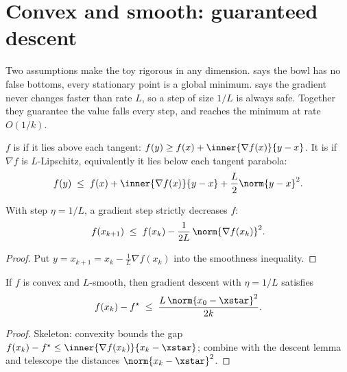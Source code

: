 \section{Convex and smooth: guaranteed descent}\label{sec:smooth}
\quad{}

\begin{strand}
Two assumptions make the toy rigorous in any dimension.  says the bowl has no
false bottoms, every stationary point is a global minimum.  says the
gradient never changes faster than rate $L$, so a step of size $1/L$ is always safe. Together they
guarantee the value falls every step, and reaches the minimum at rate $O(1/k)$.
\end{strand}


\begin{definition}\label{def:smooth}
$f$ is  if it lies above each tangent: $f(y)\ge f(x)+\inner{\nabla f(x)}{y-x}$. It
is  if $\nabla f$ is $L$-Lipschitz, equivalently it lies below each tangent
parabola:
\[
  f(y)\;\le\; f(x)+\inner{\nabla f(x)}{y-x}+\frac{L}{2}\norm{y-x}^2 .
\]
\end{definition}


\begin{lemma}\label{lem:descent}
With step $\eta=1/L$, a gradient step strictly decreases $f$:
\[
  f(x_{k+1})\;\le\; f(x_k)-\frac{1}{2L}\,\norm{\nabla f(x_k)}^2 .
\]
\end{lemma}
\begin{proof}
Put $y=x_{k+1}=x_k-\tfrac1L\nabla f(x_k)$ into the smoothness inequality. 
\end{proof}

\begin{theorem}\label{thm:smoothrate}
If $f$ is convex and $L$-smooth, then gradient descent with $\eta=1/L$ satisfies
\[
  f(x_k)-f^\star\;\le\;\frac{L\,\norm{x_0-\xstar}^2}{2k} .
\]
\end{theorem}
\begin{proof}
Skeleton: convexity bounds the gap $f(x_k)-f^\star\le\inner{\nabla f(x_k)}{x_k-\xstar}$; combine with
the descent lemma and telescope the distances $\norm{x_k-\xstar}^2$. 
\end{proof}

